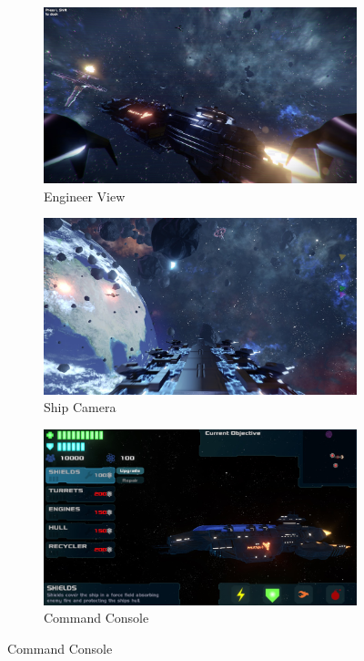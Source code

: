 \documentclass[a4paper,11pt]{article}
\begin{document}
\begin{figure}[ht]
	\centering
    \caption{Client Types}
    \begin{subfigure}[b]{0.3\textwidth}
    	\centering
    	\includegraphics[width=\textwidth]{images/eng}
    	\caption{Engineer View}
    \end{subfigure}
    \begin{subfigure}[b]{0.3\textwidth}
    	\centering
    	\includegraphics[width=\textwidth]{images/cam}
    	\caption{Ship Camera}
    \end{subfigure}
        \begin{subfigure}[b]{0.3\textwidth}
    	\centering
    	\includegraphics[width=\textwidth]{images/command}
    	\caption{Command Console}
    \end{subfigure}
\end{figure}
\end{document}
